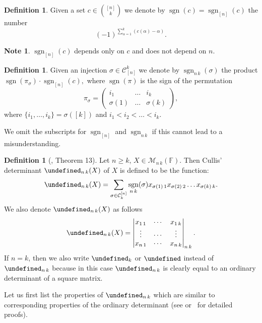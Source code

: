 \documentclass{elsarticle}
\def\ucsign{\bcpanchant}
\newenvironment{underconst}{\begin{mybox}\par\noindent\hangindent=2em\hangafter=-2
  \smash{\hbox to0pt{\hskip-\hangindent
    \lower1.5\baselineskip\hbox{\ucsign}\hfill}}
    }{\end{mybox}}
\def\M{{\mathcal M}}
\let\det\undefined
\DeclareMathOperator{\det}{det}
\DeclareMathOperator{\sgn}{sgn}
\theoremstyle{plain}
\theoremstyle{definition}
\newtheorem{definition}[theorem]{Definition}
\newtheorem{note}[theorem]{Note}
\numberwithin{equation}{section}
\begin{document}
\begin{definition}Given a set $c \in \binom{[n]}{k}$ we denote by $\sgn (c) = \sgn_{[n]} (c)$ the number
$$(-1)^{\sum_{\alpha = 1}^{k} (c(\alpha) - \alpha)}.$$
\end{definition}


\begin{note}$\sgn_{[n]}(c)$ depends only on $c$ and does not depend on $n.$
\end{note}


\begin{definition}Given an injection $\sigma \in \mathcal C_{[n]}^{k}$ we denote by $\sgn_{n\,k} (\sigma)$ the product $\sgn(\pi_\sigma) \cdot \sgn_{[n]} (c),$
where $\sgn(\pi)$ is the sign of the permutation
$$
\pi_\sigma =
\begin{pmatrix}
i_1 & \ldots & i_k\\
\sigma(1) & \ldots & \sigma(k)
\end{pmatrix},
$$
where $\{i_1, \ldots, i_k\} = \sigma([k])$ and $i_1<i_2<\ldots <i_k$.
\end{definition}

We omit the subscripts for $\sgn_{[n]}$ and $\sgn_{n\,k}$ if this cannot lead to a misunderstanding.%
\begin{definition}[\cite{NAKAGAMI2007422}, Theorem 13]\label{def:CullisDet} Let  $n \ge k$, $X \in \M_{n\,k} (\mathbb F)$. Then Cullis' determinant $\det_{n\, k}(X)$ of $X$ is defined to be the function:
$$
\det_{n\, k} (X) = \sum_{\sigma \in \mathcal C_{k}^{[n]}} \sgn_{n\,k} (\sigma) x_{\sigma(1)\, 1}x_{\sigma(2)\, 2}\ldots x_{\sigma(k)\, k}.
$$
We also denote $\det_{n\, k} (X)$ as follows
\[
\det_{n\,k}(X)=\begin{vmatrix}x_{1\,1} & \cdots & x_{1\,k}\\
\vdots & \cdots & \vdots\\
x_{n\,1} & \cdots & x_{n\,k}
\end{vmatrix}_{n\,k}.
\]
If $n = k$, then we also write $\det_{k}$ or $\det$ instead of $\det_{n\,k}$ because in this case $\det_{n\,k}$ is clearly equal to an ordinary determinant of a square matrix.
\end{definition}



Let us first list the properties of $\det_{n\, k}$ which are similar to corresponding properties of the ordinary determinant (see \cite[, , ]{cullis1913} or~\cite{NAKAGAMI2007422} for detailed proofs).
\end{document}
